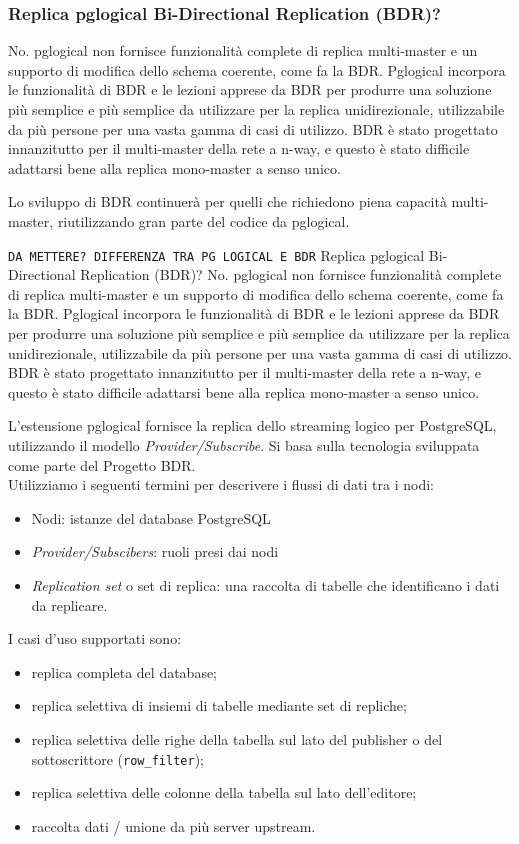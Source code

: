 \subsubsection{Replica pglogical Bi-Directional Replication (BDR)?}
No. pglogical non fornisce funzionalità complete di replica multi-master e un supporto di modifica dello schema coerente, come fa la BDR. Pglogical incorpora le funzionalità di BDR e le lezioni apprese da BDR per produrre una soluzione più semplice e più semplice da utilizzare per la replica unidirezionale, utilizzabile da più persone per una vasta gamma di casi di utilizzo. BDR è stato progettato innanzitutto per il multi-master della rete a n-way, e questo è stato difficile adattarsi bene alla replica mono-master a senso unico.

Lo sviluppo di BDR continuerà per quelli che richiedono piena capacità multi-master, riutilizzando gran parte del codice da pglogical.\cite{etichetta3}


\texttt{DA METTERE? DIFFERENZA TRA PG LOGICAL E BDR}
Replica pglogical Bi-Directional Replication (BDR)?
No. pglogical non fornisce funzionalità complete di replica multi-master e un supporto di modifica dello schema coerente, come fa la BDR. Pglogical incorpora le funzionalità di BDR e le lezioni apprese da BDR per produrre una soluzione più semplice e più semplice da utilizzare per la replica unidirezionale, utilizzabile da più persone per una vasta gamma di casi di utilizzo. BDR è stato progettato innanzitutto per il multi-master della rete a n-way, e questo è stato difficile adattarsi bene alla replica mono-master a senso unico.
%

L'estensione pglogical fornisce la replica dello streaming logico per PostgreSQL, utilizzando il modello \textit{Provider/Subscribe}. Si basa sulla tecnologia sviluppata come parte del Progetto BDR.\\

Utilizziamo i seguenti termini per descrivere i flussi di dati tra i nodi:

\begin{itemize}
\item
Nodi: istanze del database PostgreSQL
\item 
\textit{Provider/Subscibers}: ruoli presi dai nodi
\item 
\textit{Replication set} o set di replica: una raccolta di tabelle che identificano i dati da replicare.
\end{itemize}


I casi d'uso supportati sono:
\begin{itemize}
\item 
replica completa del database;
\item 
replica selettiva di insiemi di tabelle mediante set di repliche;
\item 
replica selettiva delle righe della tabella sul lato del publisher o del sottoscrittore (\verb"row_filter");
\item 
replica selettiva delle colonne della tabella sul lato dell'editore;
\item 
raccolta dati / unione da pi\`{u} server upstream. \cite{etichetta3}
\end{itemize}


